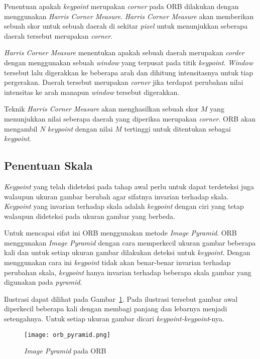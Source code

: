Penentuan apakah \textit{keypoint} merupakan \textit{corner} pada ORB dilakukan dengan menggunakan \textit{Harris Corner Measure}. \textit{Harris Corner Measure} akan memberikan sebuah skor untuk sebuah daerah di sekitar \textit{pixel} untuk menunjukkan seberapa daerah tersebut merupakan \textit{corner}. 

\textit{Harris Corner Measure} menentukan apakah sebuah daerah merupakan \textit{corder} dengan menggunakan sebuah \textit{window} yang terpusat pada titik \textit{keypoint}. \textit{Window} tersebut lalu digerakkan ke beberapa arah dan dihitung intensitasnya untuk tiap pergerakan. Daerah tersebut merupakan \textit{corner} jika terdapat perubahan nilai intensitas ke arah manapun \textit{window} tersebut digerakkan.

Teknik \textit{Harris Corner Measure} akan menghasilkan sebuah skor $M$ yang menunjukkan nilai seberapa daerah yang diperiksa merupakan \textit{corner}. ORB akan mengambil $N$ \textit{keypoint} dengan nilai $M$ tertinggi untuk ditentukan sebagai \textit{keypoint}.  

\subsection{Penentuan Skala}
\label{subsec:orb_skala}
\textit{Keypoint} yang telah dideteksi pada tahap awal perlu untuk dapat terdeteksi juga walaupun ukuran gambar berubah agar sifatnya invarian terhadap skala. \textit{Keypoint} yang invarian terhadap skala adalah \textit{keypoint} dengan ciri yang tetap walaupun dideteksi pada ukuran gambar yang berbeda. 

Untuk mencapai sifat ini ORB menggunakan metode \textit{Image Pyramid}. ORB menggunakan \textit{Image Pyramid} dengan cara memperkecil ukuran gambar beberapa kali dan untuk setiap ukuran gambar dilakukan deteksi untuk \textit{keypoint}. Dengan menggunakan cara ini \textit{keypoint} tidak akan benar-benar invarian terhadap perubahan skala, \textit{keypoint} hanya invarian terhadap beberapa skala gambar yang digunakan pada \textit{pyramid}.

Ilustrasi dapat dilihat pada Gambar~\ref{fig:orb_pyramid}. Pada ilustrasi tersebut gambar awal diperkecil beberapa kali dengan membagi panjang dan lebarnya menjadi setengahnya. Untuk setiap ukuran gambar dicari \textit{keypoint-keypoint}-nya.

\begin{figure}[H]
	\centering
	\texttt{[image: orb\_pyramid.png]}
	\caption{\textit{Image Pyramid} pada ORB}
	\label{fig:orb_pyramid}	
\end{figure}

